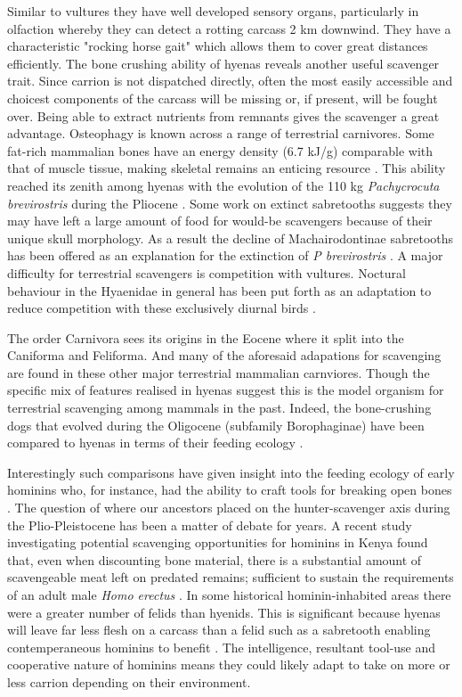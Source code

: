 \documentclass[a4paper,12pt]{article}
\begin{document}
Similar to vultures they have well developed sensory organs, particularly in olfaction whereby they can detect a rotting carcass 2 km downwind. They have a characteristic "rocking horse gait"  which allows them to cover great distances efficiently. The bone crushing ability of hyenas reveals another useful scavenger trait. Since carrion is not dispatched directly, often the most easily accessible and choicest components of the carcass will be missing or, if present, will be fought over. Being able to extract nutrients from remnants gives the scavenger a great advantage. Osteophagy is known across a range of terrestrial carnivores. Some fat-rich mammalian bones have an energy density (6.7 kJ/g) comparable with that of muscle tissue, making skeletal remains an enticing resource \citep{brown1989study}. This ability reached its zenith among hyenas with the evolution of the 110 kg \textit{Pachycrocuta brevirostris} during the Pliocene \citep{palmqvist2011giant}. Some work on extinct sabretooths suggests they may have left a large amount of food for would-be scavengers because of their unique skull morphology. As a result the decline of Machairodontinae sabretooths has been offered as an explanation for the extinction of \textit{P brevirostris} \citep{palmqvist2011giant}. A major difficulty for terrestrial scavengers is competition with vultures. Noctural behaviour in the Hyaenidae in general has been put forth as an adaptation to reduce competition with these exclusively diurnal birds \citep{gittleman2013carnivore}. 

The order Carnivora sees its origins in the Eocene where it split into the Caniforma and Feliforma. And many of the aforesaid adapations for scavenging are found in these other major terrestrial mammalian carnviores. Though the specific mix of features realised in hyenas suggest this is the model organism for terrestrial scavenging among mammals in the past. Indeed, the bone-crushing dogs that evolved during the Oligocene (subfamily Borophaginae) have been compared to hyenas in terms of their feeding ecology \citep{van2003chapter,martin2016pursuit}. 

Interestingly such comparisons have given insight into the feeding ecology of early hominins who, for instance, had the ability to craft tools for breaking open bones \citep{hone2010feeding,ARCM:ARCM12084}. The question of where our ancestors placed on the hunter-scavenger axis during the Plio-Pleistocene has been a matter of debate for years. A recent study investigating potential scavenging opportunities for hominins in Kenya found that, even when discounting bone material, there is a substantial amount of scavengeable meat left on predated remains; sufficient to sustain the requirements of an adult male \textit{Homo erectus} \citep{pobiner2015new}. In some historical hominin-inhabited areas there were a greater number of felids than hyenids. This is significant because hyenas will leave far less flesh on a carcass than a felid such as a sabretooth enabling contemperaneous hominins to benefit \citep{pobiner2015new}. The intelligence, resultant tool-use and cooperative nature of hominins means they could likely adapt to take on more or less carrion depending on their environment. 
\end{document}
